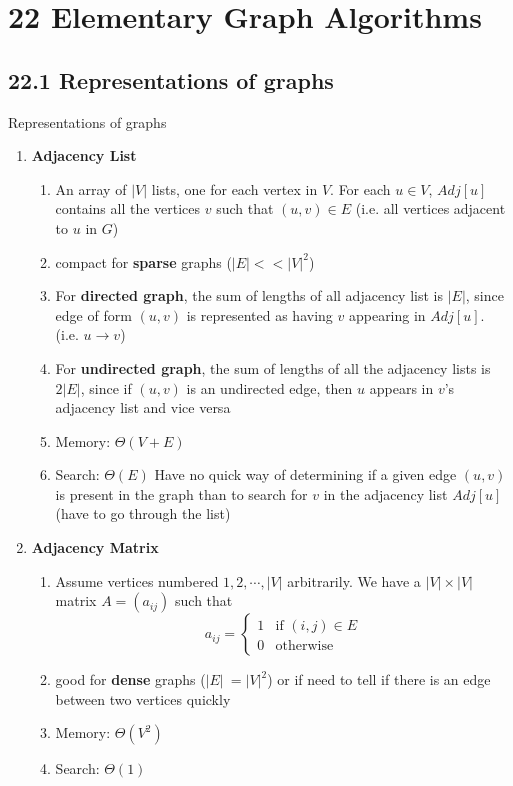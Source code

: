 \documentclass[11pt]{article}
\begin{document}
\section*{22 Elementary Graph Algorithms}


\subsection*{22.1 Representations of graphs}




\begin{defn*}
    Representations of graphs
    \begin{enumerate}
        \item \textbf{Adjacency List} 
        \begin{enumerate}
            \item An array of $|V|$ lists, one for each vertex in $V$. For each $u\in V$, $Adj[u]$ contains all the vertices $v$ such that $(u,v) \in E$ (i.e. all vertices adjacent to $u$ in $G$)
            \item compact for \textbf{sparse} graphs ($|E| << |V|^2$)
            \item For \textbf{directed graph}, the sum of lengths of all adjacency list is $|E|$, since edge of form $(u,v)$ is represented as having $v$ appearing in $Adj[u]$. (i.e. $u \to v$)
            \item For \textbf{undirected graph}, the sum of lengths of all the adjacency lists is $2|E|$, since if $(u,v)$ is an undirected edge, then $u$ appears in $v$'s adjacency list and vice versa 
            \item Memory: $\Theta(V + E)$
            \item Search: $\Theta(E)$ Have no quick way of determining if a given edge $(u,v)$ is present in the graph than to search for $v$ in the adjacency list $Adj[u]$ (have to go through the list)
        \end{enumerate}
        \item \textbf{Adjacency Matrix}
        \begin{enumerate}
            \item Assume vertices numbered $1, 2, \cdots, |V|$ arbitrarily. We have a $|V| \times |V|$ matrix $A = (a_{ij})$ such that 
            \[
                a_{ij} = 
                \begin{cases}
                    1 & \text{if } (i,j)\in E \\
                    0 & \text{otherwise}
                \end{cases}   
            \]
            \item good for \textbf{dense} graphs ($|E| ~= |V|^2$) or if need to tell if there is an edge between two vertices quickly
            \item Memory: $\Theta(V^2)$
            \item Search: $\Theta(1)$
        \end{enumerate}
    \end{enumerate}
\end{defn*}
\end{document}
